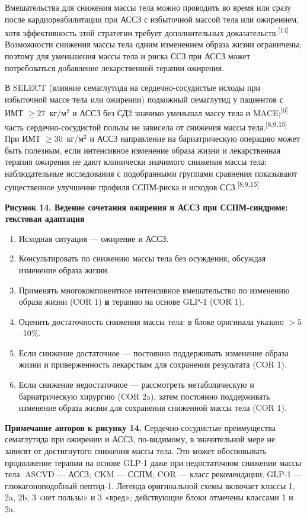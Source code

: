 \documentclass[11pt,a4paper]{article}
\newcommand{\src}[1]{\textsuperscript{[#1]}}
\newcommand{\heading}[1]{\par\medskip\textbf{#1}\par}
\begin{document}
Вмешательства для снижения массы тела можно проводить во время или сразу после кардиореабилитации при АССЗ с избыточной массой тела или ожирением, хотя эффективность этой стратегии требует дополнительных доказательств.\src{14} Возможности снижения массы тела одним изменением образа жизни ограничены; поэтому для уменьшения массы тела и риска ССЗ при АССЗ может потребоваться добавление лекарственной терапии ожирения.

В SELECT (влияние семаглутида на сердечно-сосудистые исходы при избыточной массе тела или ожирении) подкожный семаглутид у пациентов с ИМТ $\geq27$~кг/м$^2$ и АССЗ без СД2 значимо уменьшал массу тела и MACE;\src{6} часть сердечно-сосудистой пользы не зависела от снижения массы тела.\src{8,9,15} При ИМТ $\geq30$~кг/м$^2$ и АССЗ направление на бариатрическую операцию может быть полезным, если интенсивное изменение образа жизни и лекарственная терапия ожирения не дают клинически значимого снижения массы тела: наблюдательные исследования с подобранными группами сравнения показывают существенное улучшение профиля ССПМ-риска и исходов ССЗ.\src{8,9,15}

\heading{Рисунок 14. Ведение сочетания ожирения и АССЗ при ССПМ-синдроме: текстовая адаптация}
\begin{enumerate}
\item Исходная ситуация --- ожирение и АССЗ.
\item Консультировать по снижению массы тела без осуждения, обсуждая изменение образа жизни.
\item Применять многокомпонентное интенсивное вмешательство по изменению образа жизни (COR 1) \textbf{и} терапию на основе GLP-1 (COR 1).
\item Оценить достаточность снижения массы тела: в блоке оригинала указано $>5$--10\%.
\item Если снижение достаточное --- постоянно поддерживать изменение образа жизни и приверженность лекарствам для сохранения результата (COR 1).
\item Если снижение недостаточное --- рассмотреть метаболическую и бариатрическую хирургию (COR 2a), затем постоянно поддерживать изменение образа жизни для сохранения сниженной массы тела (COR 1).
\end{enumerate}

\textbf{Примечание авторов к рисунку 14.} Сердечно-сосудистые преимущества семаглутида при ожирении и АССЗ, по-видимому, в значительной мере не зависят от достигнутого снижения массы тела. Это может обосновывать продолжение терапии на основе GLP-1 даже при недостаточном снижении массы тела. ASCVD --- АССЗ; CKM --- ССПМ; COR --- класс рекомендации; GLP-1 --- глюкагоноподобный пептид-1. Легенда оригинальной схемы включает классы 1, 2a, 2b, 3 «нет пользы» и 3 «вред»; действующие блоки отмечены классами 1 и 2a.
\end{document}
